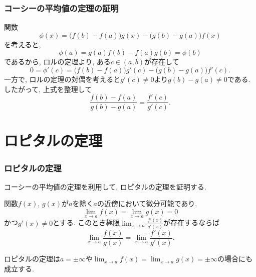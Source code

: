 \begin{frame}
\frametitle{コーシーの平均値の定理の証明}

関数
$$
\phi(x)=\big(f(b)-f(a)\big)g(x)-\big(g(b)-g(a)\big)f(x)
$$
を考えると, 
$$
\phi(a)=g(a)f(b)-f(a)g(b)=\phi(b)
$$
であるから, ロルの定理より, ある$c \in (a,b)$が存在して
$$
0=\phi'(c)=\big(f(b)-f(a)\big)g'(c)-\big(g(b)-g(a)\big)f'(c). 
$$
一方で, ロルの定理の対偶を考えると$g'(c)\ne0$より$g(b)-g(a)\ne0$である. 
したがって, 上式を整理して
$$
\frac{f(b)-f(a)}{g(b)-g(a)}=\frac{f'(c)}{g'(c)}. 
$$



\end{frame}



\section{ロピタルの定理}

\begin{frame}
\frametitle{ロピタルの定理}

コーシーの平均値の定理を利用して, ロピタルの定理を証明する. 

\begin{Thm}[ロピタルの定理]
関数$f(x)$, $g(x)$が$a$を除く$a$の近傍において微分可能であり, 
$$
\lim_{x\to a}f(x) = \lim_{x\to a}g(x)=0
$$
かつ$g'(x) \ne0$とする. このとき極限$\displaystyle \lim_{x\to a}\frac{f'(x)}{g'(x)}$が存在するならば
$$
\lim_{x\to a}\frac{f(x)}{g(x)} = \lim_{x\to a}\frac{f'(x)}{g'(x)}. 
$$
\end{Thm}

ロピタルの定理は$a=\pm \infty$や$\displaystyle \lim_{x\to a}f(x) = \lim_{x\to a}g(x)=\pm \infty$の場合にも成立する. 

\end{frame}





